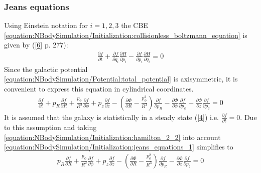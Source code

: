 \documentclass[letterpaper,10pt,english]{sphinxmanual}
\begin{document}
				
				\subsubsection{Jeans equations}
					\label{\detokenize{NBodySimulation/Initialization:jeans-equations}}
					\sphinxAtStartPar
					Using Einstein notation for \(i=1,2,3\) the CBE \eqref{equation:NBodySimulation/Initialization:collisionless_boltzmann_equation} is given by ({[}\hyperlink{cite.NBodySimulation/Appendix:id17}{6}{]} p. 277):
					\begin{equation*}
					\begin{split}\frac{\partial f}{\partial t} + \frac{\partial f}{\partial q_i}\frac{\partial H}{\partial p_i} - \frac{\partial f}{\partial p_i}\frac{\partial H}{\partial q_i} = 0\end{split}
					\end{equation*}
					\sphinxAtStartPar
					Since the galactic potential \eqref{equation:NBodySimulation/Potential:total_potential} is axisymmetric, it is convenient to express this equation in cylindrical coordinates.
					\begin{equation}\label{equation:NBodySimulation/Initialization:jeans_equations_1}
					\begin{split}\frac{\partial f}{\partial t}
					 + p_R\frac{\partial f}{\partial R}
					 + \frac{p_\phi}{R^2}\frac{\partial f}{\partial \phi}
					 + p_z\frac{\partial f}{\partial z}
					 - \left(\frac{\partial \Phi}{\partial R}-\frac{p_\phi^2}{R^3}\right)\frac{\partial f}{\partial p_R}
					 - \frac{\partial \Phi}{\partial \phi}\frac{\partial f}{\partial p_\phi}
					 - \frac{\partial \Phi}{\partial z}\frac{\partial f}{\partial p_z} = 0\end{split}
					\end{equation}
					\sphinxAtStartPar
					It is assumed that the galaxy is statistically in a steady state ({[}\hyperlink{cite.NBodySimulation/Appendix:id18}{4}{]}) i.e. \(\frac{\partial f}{\partial t}=0\).
					Due to this assumption and taking \eqref{equation:NBodySimulation/Initialization:hamilton_2_2} into account \eqref{equation:NBodySimulation/Initialization:jeans_equations_1} simplifies to
					\begin{equation}\label{equation:NBodySimulation/Initialization:jeans_equations_2}
					\begin{split}p_R\frac{\partial f}{\partial R}
					 + \frac{p_\phi}{R^2}\frac{\partial f}{\partial \phi}
					 + p_z\frac{\partial f}{\partial z}
					 - \left(\frac{\partial \Phi}{\partial R}-\frac{p_\phi^2}{R^3}\right)\frac{\partial f}{\partial p_R}
					 - \frac{\partial \Phi}{\partial z}\frac{\partial f}{\partial p_z} = 0\end{split}
					\end{equation}
\end{document}
